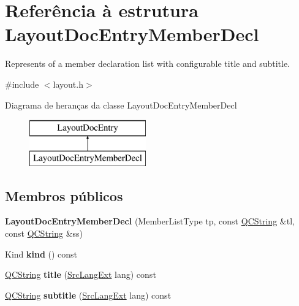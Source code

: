 \hypertarget{struct_layout_doc_entry_member_decl}{\section{Referência à estrutura Layout\-Doc\-Entry\-Member\-Decl}
\label{struct_layout_doc_entry_member_decl}
}


Represents of a member declaration list with configurable title and subtitle.  




{\ttfamily \#include $<$layout.\-h$>$}

Diagrama de heranças da classe Layout\-Doc\-Entry\-Member\-Decl\begin{figure}[H]
\begin{center}
\leavevmode
\includegraphics[height=2.000000cm]{struct_layout_doc_entry_member_decl}
\end{center}
\end{figure}
\subsection*{Membros públicos}
\begin{DoxyCompactItemize}
\item 
\hypertarget{struct_layout_doc_entry_member_decl_af744eba69585f2a3035c70b093ce05b0}{{\bfseries Layout\-Doc\-Entry\-Member\-Decl} (Member\-List\-Type tp, const \hyperlink{class_q_c_string}{Q\-C\-String} \&tl, const \hyperlink{class_q_c_string}{Q\-C\-String} \&ss)}\label{struct_layout_doc_entry_member_decl_af744eba69585f2a3035c70b093ce05b0}

\item 
\hypertarget{struct_layout_doc_entry_member_decl_aa9d037bed9f9a083d0cd01485637d843}{Kind {\bfseries kind} () const }\label{struct_layout_doc_entry_member_decl_aa9d037bed9f9a083d0cd01485637d843}

\item 
\hypertarget{struct_layout_doc_entry_member_decl_a14d417557eb866a95f7bd071619d8ed9}{\hyperlink{class_q_c_string}{Q\-C\-String} {\bfseries title} (\hyperlink{types_8h_a9974623ce72fc23df5d64426b9178bf2}{Src\-Lang\-Ext} lang) const }\label{struct_layout_doc_entry_member_decl_a14d417557eb866a95f7bd071619d8ed9}

\item 
\hypertarget{struct_layout_doc_entry_member_decl_afe5489737acdf6cdd3642ec78910df2e}{\hyperlink{class_q_c_string}{Q\-C\-String} {\bfseries subtitle} (\hyperlink{types_8h_a9974623ce72fc23df5d64426b9178bf2}{Src\-Lang\-Ext} lang) const }\label{struct_layout_doc_entry_member_decl_afe5489737acdf6cdd3642ec78910df2e}

\end{DoxyCompactItemize}
